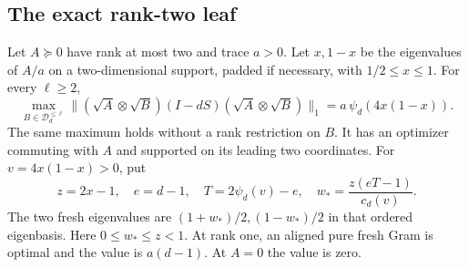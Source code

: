 \subsection{The exact rank-two leaf}
\begin{lemma}
\label{lem:ranktwoleaf95}
Let $A\succeq0$ have rank at most two and trace $a>0$.  Let
$x,1-x$ be the eigenvalues of $A/a$ on a two-dimensional support,
padded if necessary, with $1/2\le x\le1$.  For every $\ell\ge2$,
\begin{equation}\label{eq:ranktwoleaf95}
 \max_{B\in\mathcal D_d^{\le\ell}}
 \|(\sqrt A\otimes\sqrt B)(I-dS)(\sqrt A\otimes\sqrt B)\|_1
                 =a\,\psi_d(4x(1-x)).
\end{equation}
The same maximum holds without a rank restriction on $B$.  It has
an optimizer commuting with $A$ and supported on its leading two
coordinates.  For $v=4x(1-x)>0$, put
\begin{equation}\label{eq:freshweights95}
 z=2x-1,\quad e=d-1,\quad
 T=2\psi_d(v)-e,\quad
 w_*=\frac{z(eT-1)}{c_d(v)}.
\end{equation}
The two fresh eigenvalues are $(1+w_*)/2,(1-w_*)/2$ in that
ordered eigenbasis.  Here $0\le w_*\le z<1$.  At rank one, an
aligned pure fresh Gram is optimal and the value is $a(d-1)$.
At $A=0$ the value is zero.
\end{lemma}
